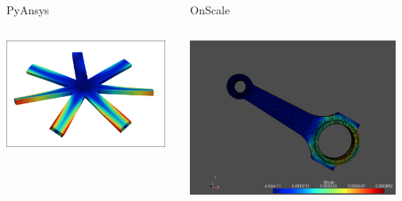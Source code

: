 \documentclass[t]{beamer}
\begin{document}
\begin{frame}
\begin{columns}[T]
    \begin{column}{.3\textwidth}
        \begin{exampleblock}{PyAnsys}
        \inputminted[fontsize=\tiny]{python}{code/pymapdl_eo_disc.py}
        \centering
        \href{https://github.com/pyansys/ray-segments-pyvista}{\includegraphics[width=0.95\textwidth]{figures/pymapdl_eo_disc.png}}
        \end{exampleblock}
      \end{column}

    \begin{column}{.3\textwidth}
        \begin{exampleblock}{OnScale}
        \inputminted[fontsize=\tiny]{python}{code/onscale_pyvista.py}
        \centering
        \href{https://github.com/pyansys/ray-segments-pyvista}{\includegraphics[width=0.95\textwidth]{figures/onscale_pyvista.png}}
        \end{exampleblock}
      \end{column}

  \end{columns}

\end{frame}
\end{document}
